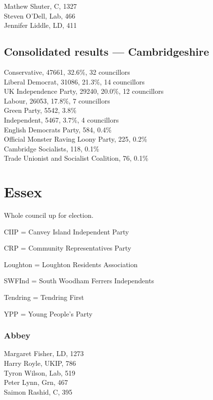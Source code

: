 \documentclass[a4paper,openany,10pt]{book}
\begin{document}
Mathew Shuter, C, 1327\\
Steven O'Dell, Lab, 466\\
Jennifer Liddle, LD, 411\\




\subsection*{Consolidated results --- Cambridgeshire}
Conservative, 47661, 32.6\%, 32 councillors\\
Liberal Democrat, 31086, 21.3\%, 14 councillors\\
UK Independence Party, 29240, 20.0\%, 12 councillors\\
Labour, 26053, 17.8\%, 7 councillors\\
Green Party, 5542, 3.8\% \\
Independent, 5467, 3.7\%, 4 councillors\\
English Democrats Party, 584, 0.4\% \\
Official Monster Raving Loony Party, 225, 0.2\% \\
Cambridge Socialists, 118, 0.1\% \\
Trade Unionist and Socialist Coalition, 76, 0.1\% \\


\vfill

\section{Essex}

Whole council up for election.

CIIP = Canvey Island Independent Party

CRP = Community Representatives Party

Loughton = Loughton Residents Association

SWFInd = South Woodham Ferrers Independents

Tendring = Tendring First

YPP = Young People's Party



\subsubsection*{Abbey}



Margaret Fisher, LD, 1273\\
Harry Royle, UKIP, 786\\
Tyron Wilson, Lab, 519\\
Peter Lynn, Grn, 467\\
Saimon Rashid, C, 395\\
\end{document}
